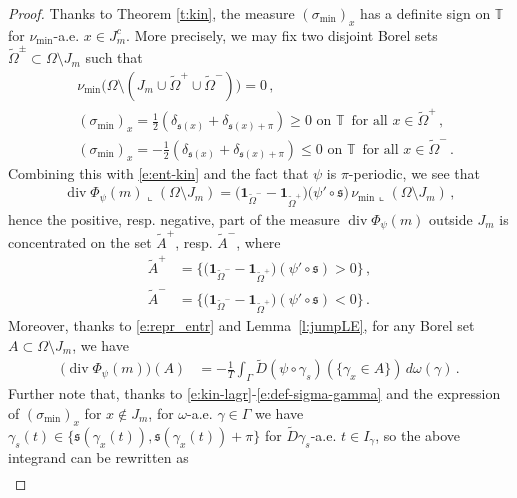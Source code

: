 \documentclass[10pt,a4paper]{amsart}
\DeclareMathOperator{\dv}{div}
\newcommand{\T}{{\mathbb T}}
\begin{document}
\begin{proof}
Thanks to Theorem \ref{t:kin}, the measure $(\sigma_{\min})_x$ has a definite sign on $\T$ for $\nu_{\min}$-a.e. $x \in J_m^c$.
More precisely, we may fix two disjoint Borel sets 
$\tilde\Omega^\pm\subset\Omega\setminus J_m$
such that 
\begin{align*}
&\nu_{\min}\big(\Omega\setminus (J_m\cup\tilde\Omega^+\cup\tilde\Omega^-)\big)=0\,,\\
&
(\sigma_{\min})_x  
=  \frac 12 \left( \delta_{\mathfrak s(x)}+ \delta_{\mathfrak s(x)+ \pi}\right)
\geq 0 \text{ on }\T\, \text{ for all }x\in\tilde\Omega^+\,,\\
&
(\sigma_{\min})_x 
=
-  \frac 12 \left( \delta_{\mathfrak s(x)}+ \delta_{\mathfrak s(x)+ \pi}\right)
\leq 0 \text{ on }\T\, \text{ for all }x\in\tilde\Omega^-\,.
\end{align*}
Combining this with \eqref{e:ent-kin} and the fact that $\psi$ is $\pi$-periodic, we see that
\begin{align*}
\dv\Phi_\psi(m)\llcorner (\Omega\setminus J_m)
=\big(\mathbf 1_{\tilde\Omega^-}-\mathbf 1_{\tilde\Omega^+}\big) \big(\psi'\circ \mathfrak s \big) \, \nu_{\min}\llcorner (\Omega\setminus J_m)\,,
\end{align*}
hence the positive, resp. negative, part of the measure
 $\dv\Phi_\psi(m)$ outside $J_m$ is concentrated on the set
 $\tilde A^+$, resp. $\tilde A^-$, where
 \begin{align*}
\tilde A^+ 
&
= \big\lbrace (\mathbf 1_{\tilde\Omega^-}-\mathbf 1_{\tilde\Omega^+}\big) (\psi'\circ \mathfrak s )>0\big\rbrace\,,
\\
\tilde A^- 
&
= \big\lbrace (\mathbf 1_{\tilde\Omega^-}-\mathbf 1_{\tilde\Omega^+}\big) (\psi'\circ \mathfrak s ) < 0\big\rbrace
\,.
 \end{align*} 
Moreover, thanks to \eqref{e:repr_entr} and Lemma~\ref{l:jumpLE}, for any Borel set $A\subset\Omega\setminus J_m$, we have
\begin{align*}
\big(\dv\Phi_\psi(m)\big) (A)
&=-\frac 1T \int_\Gamma \tilde D(\psi\circ \gamma_s)(\lbrace \gamma_x\in A\rbrace)\, d\omega(\gamma)\,.
\end{align*}
Further note that, thanks to  \eqref{e:kin-lagr}-\eqref{e:def-sigma-gamma} and the expression of 
$(\sigma_{\min} )_x$ for $x\notin J_m$,
for $\omega$-a.e. $\gamma\in\Gamma$
 we have
$\gamma_s(t)\in\lbrace \mathfrak s(\gamma_x(t)),\mathfrak s(\gamma_x(t))+\pi\rbrace$  for $\tilde D\gamma_s$-a.e. $t\in I_\gamma$, so the above integrand can be rewritten as
\begin{align*}

\end{align*}
\end{proof}
\end{document}
